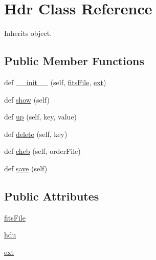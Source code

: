 \hypertarget{classpyneb_1_1utils_1_1fits_1_1_hdr}{}\section{Hdr Class Reference}
\label{classpyneb_1_1utils_1_1fits_1_1_hdr}


Inherits object.

\subsection*{Public Member Functions}
\begin{DoxyCompactItemize}
\item 
def \hyperlink{classpyneb_1_1utils_1_1fits_1_1_hdr_a2d05a033f2d6358dd8018f460a214b74}{\+\_\+\+\_\+init\+\_\+\+\_\+} (self, \hyperlink{classpyneb_1_1utils_1_1fits_1_1_hdr_ad092fe9d48062772503ecf85d5881066}{fits\+File}, \hyperlink{classpyneb_1_1utils_1_1fits_1_1_hdr_a6215e022267dc11d572ec677098947ab}{ext})
\item 
def \hyperlink{classpyneb_1_1utils_1_1fits_1_1_hdr_ab4f4398c3f210fe4ea6e720401357691}{show} (self)
\item 
def \hyperlink{classpyneb_1_1utils_1_1fits_1_1_hdr_a7d1926e51bf2cd3bae647806c129e621}{up} (self, key, value)
\item 
def \hyperlink{classpyneb_1_1utils_1_1fits_1_1_hdr_a13a8831ae566e4704c64bc3fdda044f5}{delete} (self, key)
\item 
def \hyperlink{classpyneb_1_1utils_1_1fits_1_1_hdr_ad5bfaa37294f63ee40597c9c5bd0a03e}{cheb} (self, order\+File)
\item 
def \hyperlink{classpyneb_1_1utils_1_1fits_1_1_hdr_a564562f082521e37c7029e239abb56c6}{save} (self)
\end{DoxyCompactItemize}
\subsection*{Public Attributes}
\begin{DoxyCompactItemize}
\item 
\hyperlink{classpyneb_1_1utils_1_1fits_1_1_hdr_ad092fe9d48062772503ecf85d5881066}{fits\+File}
\item 
\hyperlink{classpyneb_1_1utils_1_1fits_1_1_hdr_acab07a969db3493dffcc4db737d4fb74}{hdu}
\item 
\hyperlink{classpyneb_1_1utils_1_1fits_1_1_hdr_a6215e022267dc11d572ec677098947ab}{ext}
\end{DoxyCompactItemize}


